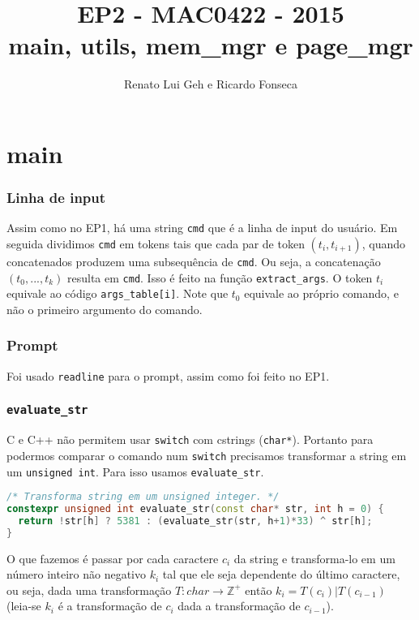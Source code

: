 \documentclass{beamer}
\title[EP2 - MAC0422]{EP2 - MAC0422 - 2015 \\
                      main, utils,  mem\_mgr e page\_mgr} %
\author{Renato Lui Geh e Ricardo Fonseca}
\date{}
\begin{document}
\begin{frame}
  \titlepage %
\end{frame}



\section{main} %

\begin{frame}
  \frametitle{Linha de input}
  Assim como no EP1, há uma string \texttt{cmd} que é a linha de input do usuário. Em seguida
  dividimos \texttt{cmd} em tokens tais que cada par de token $(t_i,t_{i+1})$, quando concatenados
  produzem uma subsequência de \texttt{cmd}. Ou seja, a concatenação $(t_0,...,t_k)$ resulta em
  \texttt{cmd}. Isso é feito na função \texttt{extract\_args}. O token $t_i$ equivale ao código
  \texttt{args\_table[i]}. Note que $t_0$ equivale ao próprio comando, e não o primeiro argumento
  do comando.
\end{frame}

\begin{frame}
  \frametitle{Prompt}
  Foi usado \texttt{readline} para o prompt, assim como foi feito no EP1.
\end{frame}

\begin{frame}[fragile]
  \frametitle{\texttt{evaluate\_str}}
  C e C++ não permitem usar \texttt{switch} com cstrings (\texttt{char*}). Portanto para podermos
  comparar o comando num \texttt{switch} precisamos transformar a string em um \texttt{unsigned
  int}. Para isso usamos \texttt{evaluate\_str}.

  \begin{lstlisting}[language=C++,basicstyle=\scriptsize]
/* Transforma string em um unsigned integer. */
constexpr unsigned int evaluate_str(const char* str, int h = 0) {
  return !str[h] ? 5381 : (evaluate_str(str, h+1)*33) ^ str[h];
}
  \end{lstlisting}

  O que fazemos é passar por cada caractere $c_i$ da string e transforma-lo em um número inteiro
  não negativo $k_i$ tal que ele seja dependente do último caractere, ou seja, dada uma
  transformação $T:char \to \mathbb{Z}^+$ então $k_i = T(c_i)|T(c_{i-1})$ (leia-se $k_i$ é a
  transformação de $c_i$ dada a transformação de $c_{i-1}$).
\end{frame}
\end{document}
